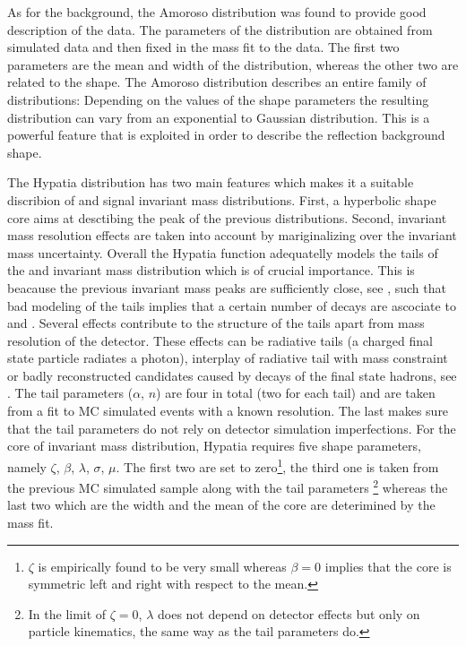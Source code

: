 As for the \LbJpsippi background, the Amoroso distribution was found to provide  good description of the data.
The parameters of the distribution are obtained from simulated data and then fixed in the mass fit to the data. The first two parameters
are the mean and width of the distribution, whereas the other two are related to the shape. The Amoroso distribution describes
an entire family of distributions: Depending on the values of the shape parameters the resulting distribution can vary from an exponential
to Gaussian distribution. This is a powerful feature that is exploited in order to describe the \LbJpsippi reflection background shape.

The Hypatia distribution has two main features which makes it a suitable discribion of \Bs and \Bd signal invariant mass distributions.
First, a hyperbolic shape core aims at desctibing the peak of the previous distributions. Second, invariant mass resolution effects are
taken into account by mariginalizing over the \Bq invariant mass uncertainty. Overall the Hypatia function adequatelly
models the tails of the \Bs and \Bd invariant mass distribution which is of crucial importance. This is beacause the previous invariant
mass peaks are sufficiently close, see , such that bad modeling of the tails implies that a certain number of \Bd decays
are ascociate to \Bs and \viceversa. Several effects contribute to the structure of the tails apart
from mass resolution of the detector. These effects can be radiative tails (a charged final state particle radiates a photon), interplay of
radiative tail with \jpsi mass constraint or badly reconstructed candidates caused by decays of the final state hadrons, see \cite{Santos:2013gra}.
The tail parameters ($\alpha$, $n$) are four in total (two for each tail) and are taken from a fit to MC simulated events with a known resolution.
The last makes sure that the tail parameters do not rely on detector simulation imperfections.
For the core of invariant mass distribution, Hypatia requires five shape parameters, namely $\zeta$, $\beta$, $\lambda$, $\sigma$, $\mu$.
The first two are set to zero\footnote{$\zeta$ is empirically found to be very small whereas
$\beta = 0$ implies that the core is symmetric left and right with respect to the mean.}, the third one is taken from the previous
MC simulated sample along with the tail parameters \footnote{In the limit of $\zeta = 0$, $\lambda$ does not depend on detector
effects but only on particle kinematics, the same way as the tail parameters do.} whereas the last two which are the width and
the mean of the core are deterimined by the mass fit.

